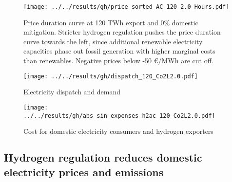 \begin{figure}[h!]
    \centering
    \texttt{[image: ../../results/gh/price\_sorted\_AC\_120\_2.0\_Hours.pdf]}
    \caption{Price duration curve at 120 TWh export and 0\% domestic mitigation. Stricter hydrogen regulation pushes the price duration curve towards the left, since additional renewable electricity capacities phase out fossil generation with higher marginal costs than renewables. Negative prices below -50 €/MWh are cut off.}
    \label{fig:pdc-120-0}
\end{figure}



\begin{figure*}[h!]
    \centering
    \begin{subfigure}[b]{0.49\linewidth}
        \centering
        \texttt{[image: ../../results/gh/dispatch\_120\_Co2L2.0.pdf]}
        \caption{Electricity dispatch and demand}
        \label{fig:dispatch_rule}
    \end{subfigure}
    \hfill
    \begin{subfigure}[b]{0.49\linewidth}
        \centering
        \texttt{[image: ../../results/gh/abs\_sin\_expenses\_h2ac\_120\_Co2L2.0.pdf]}
        \caption{Cost for domestic electricity consumers and hydrogen exporters}
        \label{fig:expense_h2ac}
    \end{subfigure}
    \hfill
    \caption{Electricity dispatch and demand (\ref{fig:dispatch_rule}) and cost for consumers (\ref{fig:expense_h2ac}) for various (hydrogen) temporal matching regimes in the 120 TWh export and 0\% mitigation scenario. Stricter temporal matching decreases carbon-intensive electricity generation (coal \& gas) for hydrogen generation and even domestic electricity consumers (s. Fig. \ref{fig:dispatch_rule}). Cost for export hydrogen generation increase to fulfill the temporal matching constraint, whereas domestic electricity consumers profit from stricter hydrogen regulation.}
    \label{fig:expenses_rule}
\end{figure*}


\subsection{Hydrogen regulation reduces domestic electricity prices and emissions}
\label{subsec:benefits_rule}

